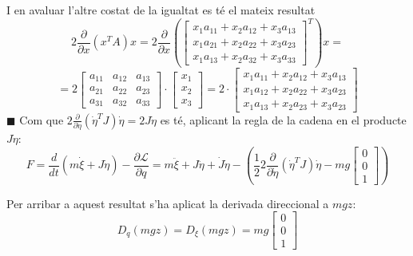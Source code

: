 \documentclass[twoside]{article}
\begin{document}
I en avaluar l'altre costat de la igualtat es té el mateix resultat
\begin{equation}
2 \frac{\partial}{\partial x}(x^{T}A)x=2 \frac{\partial}{\partial x} \left( \left[ \begin{array}{ccc}
x_1a_{11}+x_2a_{12}+x_3a_{13} \\
x_1a_{21}+x_2a_{22}+x_3a_{23} \\
x_1a_{13}+x_2a_{32}+x_3a_{33}
\end{array} \right]^{T} \right)x=
\end{equation}
\begin{equation}
=2\left[\begin{array}{ccc}
a_{11} & a_{12} & a_{13} \\
a_{21} & a_{22} & a_{23} \\
a_{31} & a_{32} & a_{33} 
\end{array} \right]\cdot\left[\begin{array}{c}
x_1 \\
x_2 \\
x_3
\end{array} \right]=2\cdot\left[ \begin{array}{c}
x_1a_{11}+x_2a_{12}+x_3a_{13} \\
x_1a_{12}+x_2a_{22}+x_3a_{23} \\
x_1a_{13}+x_2a_{23}+x_3a_{23}
\end{array} \right]
\end{equation}
\hfill $\blacksquare$ \newpage
Com que $2 \frac{\partial}{\partial \dot{\eta}}(\dot{\eta}^{T}J)\dot{\eta}=2 J \dot{\eta}$ es té, aplicant la regla de la cadena en el producte $J\dot{\eta}$:
\begin{equation}
F=\frac{d}{dt}\left(m \dot{\xi}+J \dot{\eta}\right)-\frac{\partial \mathcal{L}}{\partial q} =m\ddot{\xi} + J\ddot{\eta} + \dot{J}\dot{\eta}-\left( \frac{1}{2} 2 \frac{\partial}{\partial \dot{\eta}} ( \dot{\eta}^{T}J)\dot{\eta} - mg\left[\begin{array}{c}
0 \\
0 \\
1
\end{array} \right] \right)
\end{equation}

Per arribar a aquest resultat s'ha aplicat la derivada direccional a $mgz$:
\begin{equation}
D_q(mgz)=D_\xi(mgz)=mg \left[ \begin{array}{c}
0 \\
0 \\
1
\end{array} \right]
\end{equation}
\end{document}

